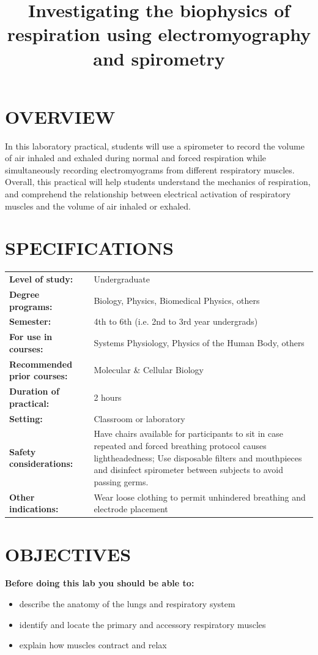\documentclass[12pt]{article}
\title{\vspace{-1.8cm}\Large{\textbf{Investigating the biophysics of respiration using electromyography and spirometry}}}
\author{}
\date{}
\begin{document}
\maketitle


\section*{OVERVIEW}

In this laboratory practical, students will use a spirometer to record the volume of air inhaled and exhaled during normal and forced respiration while simultaneously recording electromyograms from different respiratory muscles. Overall, this practical will help students understand the mechanics of respiration, and comprehend the relationship between electrical activation of respiratory muscles and the volume of air inhaled or exhaled.

\section*{SPECIFICATIONS}
\begin{tabular}{p{6cm} p{10cm}}
\textbf{Level of study:} & Undergraduate \\
\textbf{Degree programs:} & Biology, Physics, Biomedical Physics, others \\
\textbf{Semester:} & 4th to 6th (i.e. 2nd to 3rd year undergrads) \\ 
\textbf{For use in courses:} & Systems Physiology, Physics of the Human Body, others \\
\textbf{Recommended prior courses:} & Molecular \& Cellular Biology \\
\textbf{Duration of practical:} & 2 hours \\
\textbf{Setting:} & Classroom or laboratory \\
\textbf{Safety considerations:} & Have chairs available for participants to sit in case repeated and forced breathing protocol causes lightheadedness; Use disposable filters and mouthpieces and disinfect spirometer between subjects to avoid passing germs. \\
\textbf{Other indications:} & Wear loose clothing to permit unhindered breathing and electrode placement
\end{tabular}

\section*{OBJECTIVES}
\textbf{Before doing this lab you should be able to:}
\begin{itemize}
\item describe the anatomy of the lungs and respiratory system
\item identify and locate the primary and accessory respiratory muscles 
\item explain how muscles contract and relax
\end{itemize}
 
\end{document}
